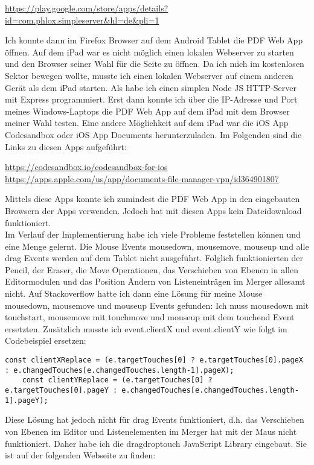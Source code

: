 \url{https://play.google.com/store/apps/details?id=com.phlox.simpleserver&hl=de&pli=1}

Ich konnte dann im Firefox Browser auf dem Android Tablet die PDF Web App öffnen. Auf dem iPad war es nicht möglich einen lokalen Webserver zu starten und den Browser seiner Wahl für die Seite zu öffnen. Da ich mich im kostenlosen Sektor bewegen wollte, musste ich einen lokalen Webserver auf einem anderen Gerät als dem iPad starten. Als habe ich einen simplen Node JS HTTP-Server mit Express programmiert. Erst dann konnte ich über die IP-Adresse und Port meines Windows-Laptops die PDF Web App auf dem iPad mit dem Browser meiner Wahl testen. Eine andere Möglichkeit auf dem iPad war die iOS App Codesandbox oder iOS App Documents herunterzuladen. Im Folgenden sind die Links zu diesen Apps aufgeführt:

\url{https://codesandbox.io/codesandbox-for-ios} \\
\url{https://apps.apple.com/us/app/documents-file-manager-vpn/id364901807}

Mittels diese Apps konnte ich zumindest die PDF Web App in den eingebauten Browsern der Apps verwenden. Jedoch hat mit diesen Apps kein Dateidownload funktioniert. \\

Im Verlauf der Implementierung habe ich viele Probleme feststellen können und eine Menge gelernt. Die Mouse Events mousedown, mousemove, mouseup und alle drag Events werden auf dem Tablet nicht ausgeführt. Folglich funktionierten der Pencil, der Eraser, die Move Operationen, das Verschieben von Ebenen in allen Editormodulen und das Position Ändern von Listeneinträgen im Merger allesamt nicht. Auf Stackoverflow hatte ich dann eine Lösung für meine Mouse mousedown, mousemove und mouseup Events gefunden: Ich muss mousedown mit touchstart, mousemove mit touchmove und mouseup mit dem touchend Event ersetzten. Zusätzlich musste ich event.clientX und event.clientY wie folgt im Codebeispiel ersetzen:

\begin{lstlisting}[caption=e.clientX und e.clientY Ersetzung]
	const clientXReplace = (e.targetTouches[0] ? e.targetTouches[0].pageX : e.changedTouches[e.changedTouches.length-1].pageX);
	const clientYReplace = (e.targetTouches[0] ? e.targetTouches[0].pageY : e.changedTouches[e.changedTouches.length-1].pageY);
\end{lstlisting} 

Diese Lösung hat jedoch nicht für drag Events funktioniert, d.h. das Verschieben von Ebenen im Editor und Listenelementen im Merger hat mit der Maus nicht funktioniert. Daher habe ich die dragdroptouch JavaScript Library eingebaut. Sie ist auf der folgenden Webseite zu finden:


